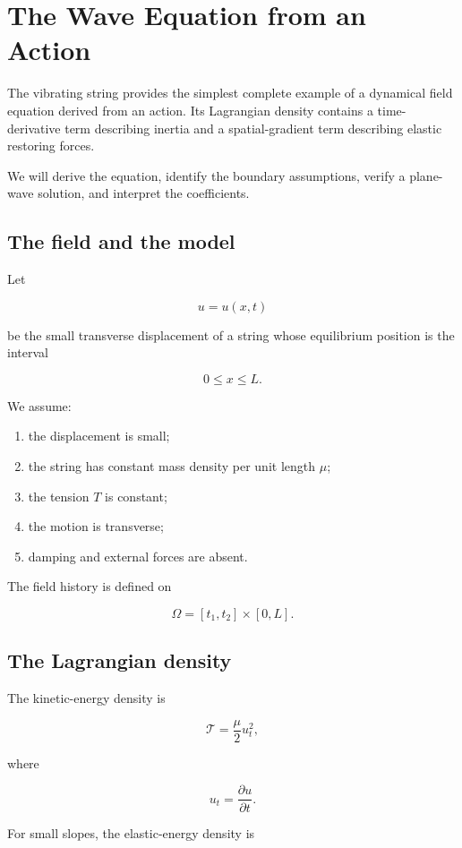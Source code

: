 \section{The Wave Equation from an Action}
\label{sec:wave_equation_from_action}

The vibrating string provides the simplest complete example of a dynamical field equation derived from an action. Its Lagrangian density contains a time-derivative term describing inertia and a spatial-gradient term describing elastic restoring forces.

We will derive the equation, identify the boundary assumptions, verify a plane-wave solution, and interpret the coefficients.

\subsection{The field and the model}

Let

\[
u=u(x,t)
\]

be the small transverse displacement of a string whose equilibrium position is the interval

\[
0\leq x\leq L.
\]

We assume:

\begin{enumerate}
    \item the displacement is small;
    \item the string has constant mass density per unit length \(\mu\);
    \item the tension \(T\) is constant;
    \item the motion is transverse;
    \item damping and external forces are absent.
\end{enumerate}

The field history is defined on

\[
\Omega=[t_{1},t_{2}]\times[0,L].
\]

\subsection{The Lagrangian density}

The kinetic-energy density is

\[
\mathcal{T}
=
\frac{\mu}{2}u_{t}^{2},
\]

where

\[
u_{t}=\frac{\partial u}{\partial t}.
\]

For small slopes, the elastic-energy density is

